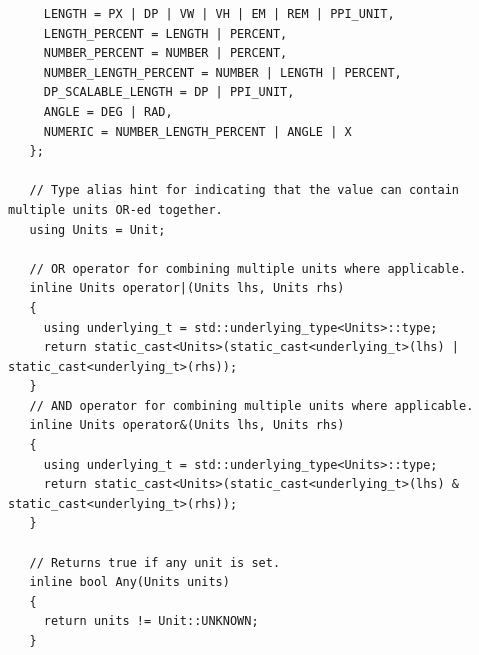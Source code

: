 \documentclass{article}
\begin{document}
\begin{verbatim}
     LENGTH = PX | DP | VW | VH | EM | REM | PPI_UNIT,
     LENGTH_PERCENT = LENGTH | PERCENT,
     NUMBER_PERCENT = NUMBER | PERCENT,
     NUMBER_LENGTH_PERCENT = NUMBER | LENGTH | PERCENT,
     DP_SCALABLE_LENGTH = DP | PPI_UNIT,
     ANGLE = DEG | RAD,
     NUMERIC = NUMBER_LENGTH_PERCENT | ANGLE | X
   };

   // Type alias hint for indicating that the value can contain multiple units OR-ed together.
   using Units = Unit;

   // OR operator for combining multiple units where applicable.
   inline Units operator|(Units lhs, Units rhs)
   {
     using underlying_t = std::underlying_type<Units>::type;
     return static_cast<Units>(static_cast<underlying_t>(lhs) | static_cast<underlying_t>(rhs));
   }
   // AND operator for combining multiple units where applicable.
   inline Units operator&(Units lhs, Units rhs)
   {
     using underlying_t = std::underlying_type<Units>::type;
     return static_cast<Units>(static_cast<underlying_t>(lhs) & static_cast<underlying_t>(rhs));
   }

   // Returns true if any unit is set.
   inline bool Any(Units units)
   {
     return units != Unit::UNKNOWN;
   }
  \end{verbatim}
\end{document}
